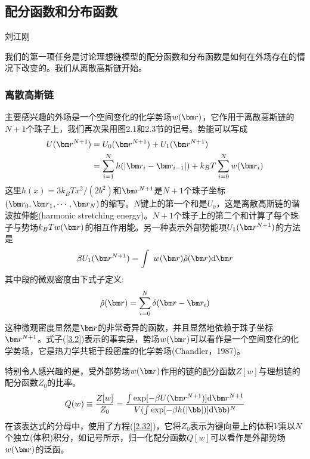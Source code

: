 \subsection{配分函数和分布函数}
\begin{center}
刘江刚
\end{center}
我们的第一项任务是讨论理想链模型的配分函数和分布函数是如何在外场存在的情况下改变的。我们从离散高斯链开始。
\subsubsection{离散高斯链}
主要感兴趣的外场是一个空间变化的化学势场$w(\br)$，它作用于离散高斯链的$N+1$个珠子上，我们再次采用图2.1和2.3节的记号。势能可以写成
\begin{equation}\label{3.1}
\begin{aligned}
U(\br^{N+1})&=U_0(\br^{N+1})+U_1(\br^{N+1})\\
&=\sum\limits_{i=1}^Nh(\left|\br_i-\br_{i-1}\right|)+k_BT\sum\limits_{i=0}^Nw(\br_i)
\end{aligned}
\end{equation}
这里$h(x)=3k_BTx^2/(2b^2)$和$\br^{N+1}$是$N+1$个珠子坐标$(\br_0,\br_1,\cdots,\br_N)$的缩写。$N$键上的第一个和是$U_0$，这是离散高斯链的谐波拉伸能(harmonic stretching energy)。$N+1$个珠子上的第二个和计算了每个珠子与势场$k_BTw(\br)$的相互作用能。另一种表示外部势能项$U_1(\br^{N+1})$的方法是
\begin{equation}\label{3.2}
\beta U_1(\br^{N+1})=\int~w(\br)\hat{\rho}(\br)\mathrm{d}\br
\end{equation}
其中段的微观密度由下式子定义:
\begin{equation}\label{3.3}
\hat{\rho}(\br)=\sum\limits_{i=0}^N\delta(\br-\br_i)
\end{equation}
这种微观密度显然是$\br$的非常奇异的函数，并且显然地依赖于珠子坐标$\br^{N+1}$。式子(\ref{3.2})表示的事实是，势场$w(\br)$可以看作是一个空间变化的化学势场，它是热力学共轭于段密度的化学势场(Chandler，1987)。

特别令人感兴趣的是，受外部势场$w(\br)$作用的链的配分函数$Z[w]$与理想链的配分函数$Z_0$的比率。
\begin{equation}\label{3.4}
Q(w)\equiv\frac{Z[w]}{Z_0}=\frac{\int\exp[-\beta U(\br^{N+1})]\mathrm{d}\br^{N+1}}{V(\int\exp[-\beta h(\left|\bb\right|)]\mathrm{d}\bb)^N}
\end{equation}
在该表达式的分母中，使用了方程(\ref{2.32})，它将$Z_0$表示为键向量上的体积$V$乘以$N$个独立(体积)积分，如记号所示，归一化配分函数$Q[w]$可以看作是外部势场$w(\br)$的泛函。


